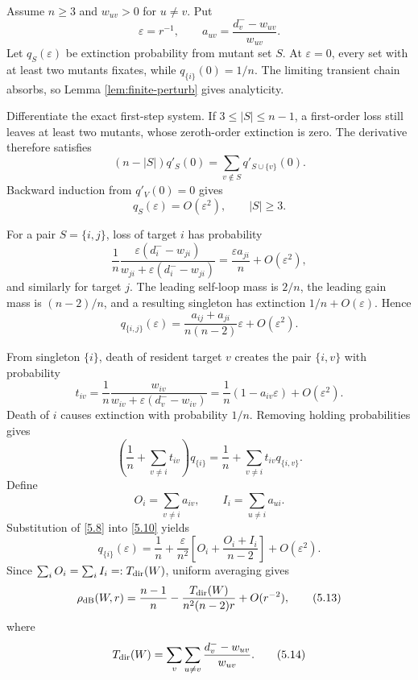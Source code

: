 Assume $n\ge3$ and $w_{uv}>0$ for $u\ne v$.  Put
\[
 \varepsilon=r^{-1},\qquad
 a_{uv}=\frac{d_v^--w_{uv}}{w_{uv}}.                         \tag{5.4}\label{5.4}
\]
Let $q_S(\varepsilon)$ be extinction probability from mutant set $S$.  At
$\varepsilon=0$, every set with at least two mutants fixates, while
$q_{\{i\}}(0)=1/n$.  The limiting transient chain absorbs, so Lemma
\ref{lem:finite-perturb} gives analyticity.

Differentiate the exact first-step system.  If $3\le|S|\le n-1$, a
first-order loss still leaves at least two mutants, whose zeroth-order
extinction is zero.  The derivative therefore satisfies
\[
 (n-|S|)q'_S(0)=\sum_{v\notin S}q'_{S\cup\{v\}}(0).           \tag{5.5}\label{5.5}
\]
Backward induction from $q'_V(0)=0$ gives
\[
 q_S(\varepsilon)=O(\varepsilon^2),\qquad |S|\ge3.           \tag{5.6}\label{5.6}
\]

For a pair $S=\{i,j\}$, loss of target $i$ has probability
\[
 \frac1n\frac{\varepsilon(d_i^--w_{ji})}
 {w_{ji}+\varepsilon(d_i^--w_{ji})}
 =\frac{\varepsilon a_{ji}}n+O(\varepsilon^2),               \tag{5.7}\label{5.7}
\]
and similarly for target $j$.  The leading self-loop mass is $2/n$, the
leading gain mass is $(n-2)/n$, and a resulting singleton has extinction
$1/n+O(\varepsilon)$.  Hence
\[
 q_{\{i,j\}}(\varepsilon)
 =\frac{a_{ij}+a_{ji}}{n(n-2)}\varepsilon+O(\varepsilon^2).  \tag{5.8}\label{5.8}
\]

From singleton $\{i\}$, death of resident target $v$ creates the pair
$\{i,v\}$ with probability
\[
 t_{iv}=\frac1n\frac{w_{iv}}
 {w_{iv}+\varepsilon(d_v^--w_{iv})}
 =\frac1n(1-a_{iv}\varepsilon)+O(\varepsilon^2).             \tag{5.9}\label{5.9}
\]
Death of $i$ causes extinction with probability $1/n$.  Removing holding
probabilities gives
\[
 \left(\frac1n+\sum_{v\ne i}t_{iv}\right)q_{\{i\}}
 =\frac1n+\sum_{v\ne i}t_{iv}q_{\{i,v\}}.                   \tag{5.10}\label{5.10}
\]
Define
\[
 O_i=\sum_{v\ne i}a_{iv},\qquad I_i=\sum_{u\ne i}a_{ui}.    \tag{5.11}\label{5.11}
\]
Substitution of \eqref{5.8} into \eqref{5.10} yields
\[
 q_{\{i\}}(\varepsilon)
 =\frac1n+\frac{\varepsilon}{n^2}
 \left[O_i+\frac{O_i+I_i}{n-2}\right]+O(\varepsilon^2).    \tag{5.12}\label{5.12}
\]
Since $\sum_iO_i=\sum_iI_i=:T_{\rm dir}(W)$, uniform averaging gives
\[
 \rho_{\mathrm{dB}}(W,r)
 =\frac{n-1}{n}-\frac{T_{\rm dir}(W)}{n^2(n-2)r}+O(r^{-2}), \tag{5.13}\label{5.13}
\]
where
\[
 T_{\rm dir}(W)=\sum_v\sum_{u\ne v}\frac{d_v^--w_{uv}}{w_{uv}}.
                                                                    \tag{5.14}\label{5.14}
\]

